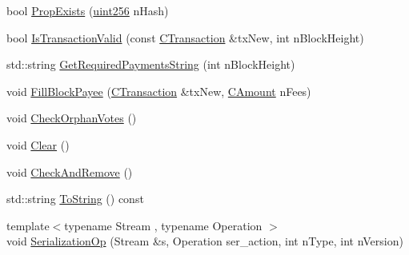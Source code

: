 \begin{DoxyCompactItemize}
\item 
bool \hyperlink{class_c_budget_manager_a39e5edc6f243614e71167b4380de30d3}{Prop\+Exists} (\hyperlink{classuint256}{uint256} n\+Hash)
\item 
bool \hyperlink{class_c_budget_manager_a1ad65c9d6a743371c0033abf623a291f}{Is\+Transaction\+Valid} (const \hyperlink{class_c_transaction}{C\+Transaction} \&tx\+New, int n\+Block\+Height)
\item 
std\+::string \hyperlink{class_c_budget_manager_aa7df3137c4b407fdbb474fcf602a67a5}{Get\+Required\+Payments\+String} (int n\+Block\+Height)
\item 
void \hyperlink{class_c_budget_manager_a8109dee7a714a093d88d4a4457bc728a}{Fill\+Block\+Payee} (\hyperlink{class_c_transaction}{C\+Transaction} \&tx\+New, \hyperlink{amount_8h_a4eaf3a5239714d8c45b851527f7cb564}{C\+Amount} n\+Fees)
\item 
void \hyperlink{class_c_budget_manager_a73100cfcd156e567eab9e62eff332659}{Check\+Orphan\+Votes} ()
\item 
void \hyperlink{class_c_budget_manager_a3a9115af29a10e955c2e1d50fd697411}{Clear} ()
\item 
void \hyperlink{class_c_budget_manager_a6fcc03bb51d846ce2934d9f739080ba7}{Check\+And\+Remove} ()
\item 
std\+::string \hyperlink{class_c_budget_manager_a122eb0e56668eabe75559494c6d80554}{To\+String} () const 
\item 
{\footnotesize template$<$typename Stream , typename Operation $>$ }\\void \hyperlink{class_c_budget_manager_a9749cf834f0877a49d3c0db0eb3b9a3c}{Serialization\+Op} (Stream \&s, Operation ser\+\_\+action, int n\+Type, int n\+Version)
\end{DoxyCompactItemize}
